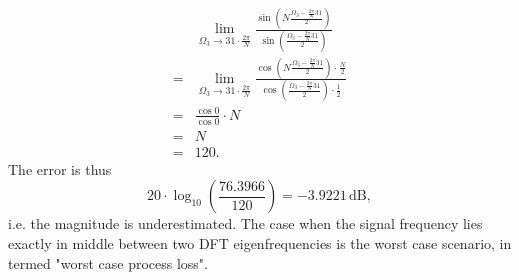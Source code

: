 \documentclass[11pt,a4paper,DIV=12]{scrartcl}
\begin{document}
\begin{Loesung}
\begin{enumerate}[label=\alph*)]
\begin{align}
	&\lim_{\Omega_3\to31\cdot\frac{2\pi}{N}}\frac{\sin\left(N\frac{\Omega_3-\frac{2\pi}{N}31}{2}\right)}{\sin\left(\frac{\Omega_3-\frac{2\pi}{N}31}{2}\right)}\nonumber\\
	=&\lim_{\Omega_3\to31\cdot\frac{2\pi}{N}}\frac{\cos\left(N\frac{\Omega_3-\frac{2\pi}{N}31}{2}\right)\cdot\frac{N}{2}}{\cos\left(\frac{\Omega_3-\frac{2\pi}{N}31}{2}\right)\cdot\frac{1}{2}}\nonumber\\
	=&\frac{\cos0}{\cos0}\cdot N\nonumber\\
	=&N\nonumber\\
	=&120\nonumber.
	\end{align}
%
	The error is thus
	\begin{equation}
	20\cdot\log_{10}\left(\frac{76.3966}{120}\right)=-3.9221\,\text{dB},\nonumber
	\end{equation}
	i.e. the magnitude is underestimated.
	The case when the signal frequency lies exactly in middle between two DFT
	eigenfrequencies is the worst case scenario, in \cite{Harris1978}
	termed "worst case process loss".
\end{enumerate}
\end{Loesung}

%
%

\end{document}
